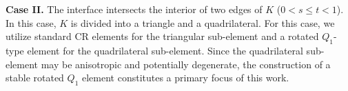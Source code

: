 \documentclass[a4paper,11pt,fleqn]{article}
\numberwithin{equation}{section}
\begin{document}
\textbf{Case II.} The interface intersects the interior of two edges of $K$ ($0 < s \leq t < 1$). In this case, $K$ is divided into a triangle and a quadrilateral. For this case, we utilize standard CR elements for the triangular sub-element and a rotated $Q_1$-type element for the quadrilateral sub-element. Since the quadrilateral sub-element may be anisotropic and potentially degenerate, the construction of a stable rotated $Q_1$ element constitutes a primary focus of this work.
%		
%		
%		
%		
%		
%						
%			
%			
%			
\end{document}

